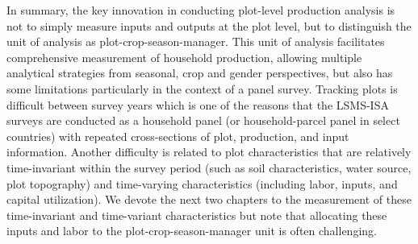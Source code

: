 \documentclass[
]{book}
\begin{document}
In summary, the key innovation in conducting plot-level production analysis is not to simply measure inputs and outputs at the plot level, but to distinguish the unit of analysis as plot-crop-season-manager. This unit of analysis facilitates comprehensive measurement of household production, allowing multiple analytical strategies from seasonal, crop and gender perspectives, but also has some limitations particularly in the context of a panel survey. Tracking plots is difficult between survey years which is one of the reasons that the LSMS-ISA surveys are conducted as a household panel (or household-parcel panel in select countries) with repeated cross-sections of plot, production, and input information. Another difficulty is related to plot characteristics that are relatively time-invariant within the survey period (such as soil characteristics, water source, plot topography) and time-varying characteristics (including labor, inputs, and capital utilization). We devote the next two chapters to the measurement of these time-invariant and time-variant characteristics but note that allocating these inputs and labor to the plot-crop-season-manager unit is often challenging.

\providecommand{\docline}[3]{\noalign{\global\setlength{\arrayrulewidth}{#1}}\arrayrulecolor[HTML]{#2}\cline{#3}}

\setlength{\tabcolsep}{2pt}

\renewcommand*{\arraystretch}{1.5}
\end{document}
